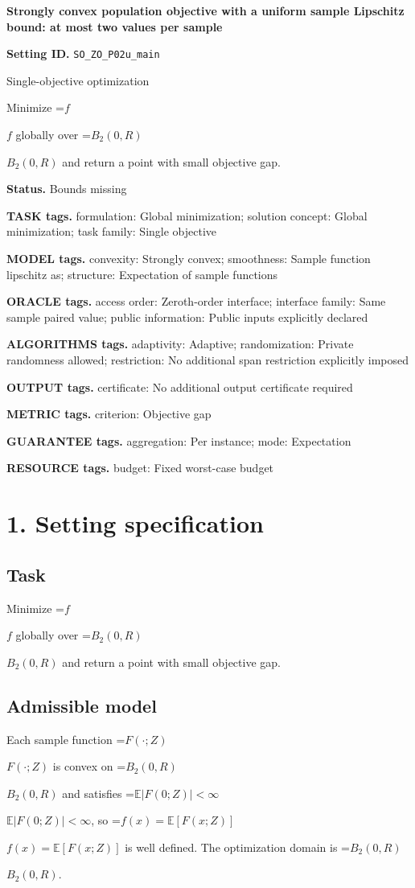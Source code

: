 \documentclass[10pt,a4paper]{article}
\newcommand{\AtlasMath}[1]{\par\begingroup\centering\setbox0=\hbox{$\displaystyle #1$}\ifdim\wd0>1.4\linewidth\typeout{ATLAS WIDE FORMULA: \the\wd0}\fi\ifdim\wd0>\linewidth\resizebox{\linewidth}{!}{\box0}\else\box0\fi\par\endgroup}
\newcommand{\AtlasInlineMath}[1]{\begingroup\setbox0=\hbox{$#1$}\ifdim\wd0>.4\linewidth\endgroup\AtlasMath{#1}\else\endgroup$#1$\fi}
\begin{document}
\raggedright

{\LARGE\bfseries\sffamily\color{AtlasNavy} Strongly convex population objective with a uniform sample Lipschitz bound: at most two values per sample\par}\vspace{5pt}
\textbf{Setting ID.} \texttt{SO\_\allowbreak{}ZO\_\allowbreak{}P02u\_\allowbreak{}main}

Single-objective optimization

Minimize \AtlasInlineMath{f} globally over \AtlasInlineMath{B_2(0,R)} and return a point with small objective gap.

\textbf{Status.} Bounds missing

\textbf{TASK tags.} formulation: Global minimization; solution concept: Global minimization; task family: Single objective

\textbf{MODEL tags.} convexity: Strongly convex; smoothness: Sample function lipschitz as; structure: Expectation of sample functions

\textbf{ORACLE tags.} access order: Zeroth-order interface; interface family: Same sample paired value; public information: Public inputs explicitly declared

\textbf{ALGORITHMS tags.} adaptivity: Adaptive; randomization: Private randomness allowed; restriction: No additional span restriction explicitly imposed

\textbf{OUTPUT tags.} certificate: No additional output certificate required

\textbf{METRIC tags.} criterion: Objective gap

\textbf{GUARANTEE tags.} aggregation: Per instance; mode: Expectation

\textbf{RESOURCE tags.} budget: Fixed worst-case budget

\section{1. Setting specification}
\subsection{Task}
Minimize \AtlasInlineMath{f} globally over \AtlasInlineMath{B_2(0,R)} and return a point with small objective gap.

\subsection{Admissible model}
Each sample function \AtlasInlineMath{F(\cdot;Z)} is convex on \AtlasInlineMath{B_2(0,R)} and satisfies \AtlasInlineMath{\mathbb{E}|F(0;Z)|<\infty}, so \AtlasInlineMath{f(x)=\mathbb{E}[F(x;Z)]} is well defined. The optimization domain is \AtlasInlineMath{B_2(0,R)}.
\end{document}
